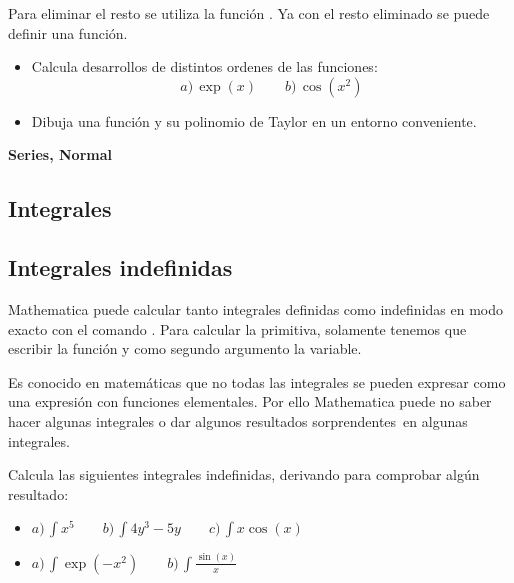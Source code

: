 \documentclass[a4paper,10pt, draft]{article}
\newcommand{\com}[1]{\textbf{\color{blue}{#1}}}
\newenvironment{capitulo}{\begin{tcolorbox}[colback=red!5!white,colframe=red!75!black]}{\end{tcolorbox}\bigskip}
\newenvironment{ejer}{\begin{tcolorbox}[center title, title=Ejercicios,
fonttitle=\sffamily\bfseries,colback=blue!5,colframe=orange]}{\end{tcolorbox}}
\newenvironment{funciones}{\begin{tcolorbox}[center title, title=Nuevas funciones, fonttitle=\sffamily\bfseries, colback=green!5!white,colframe=red!75!black]}{\end{tcolorbox}\bigskip}
\begin{document}
Para eliminar el resto se utiliza la función \com{Normal[serie]}. Ya con el resto eliminado se puede definir una función.

\begin{ejer}

\begin{itemize}

\item Calcula desarrollos de distintos ordenes de las funciones:
$$
a)\,\exp(x) \qquad  b)\,\cos(x^2) 
$$

\item Dibuja una función y su polinomio de Taylor en un entorno conveniente.


\end{itemize}


\end{ejer}  

\begin{funciones}

\textbf{Series, Normal}


\end{funciones}






\newpage

\begin{capitulo}

\section{Integrales}


\end{capitulo}

\subsection{Integrales indefinidas}

Mathematica puede calcular tanto integrales definidas como indefinidas en modo exacto con el comando \com{Integrate[f,x]}. Para calcular la primitiva, solamente tenemos que escribir la función y como segundo argumento la variable.

Es conocido en matemáticas que no todas las integrales se pueden expresar  como una expresión con funciones elementales. Por ello Mathematica puede no saber hacer algunas integrales o dar algunos resultados \guillemotleft sorprendentes\guillemotright\ en algunas integrales.


\begin{ejer}

Calcula las siguientes integrales indefinidas, derivando para comprobar algún resultado:

\begin{itemize}
\item $\displaystyle a)\,\int x^5 \qquad b)\, \int 4y^3-5y\qquad c)\, \int x\cos(x)$

\item $\displaystyle a)\, \int \exp(-x^2) \qquad b)\, \int \frac{\sin(x)}{x} $

\end{itemize}

\end{ejer}  
\end{document}

